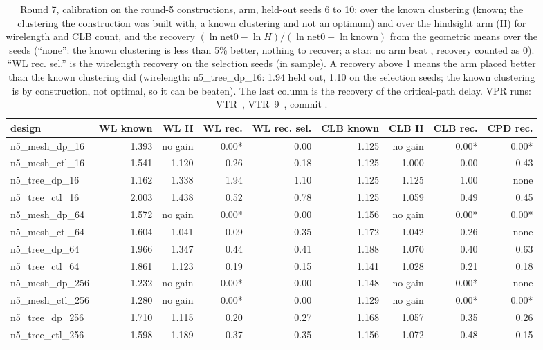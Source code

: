 \begin{table}[t]
\caption{Round 7, calibration on the round-5 constructions,  arm, held-out seeds 6 to 10:  over the known clustering (known; the clustering the construction was built with, a known clustering and not an optimum) and over the hindsight arm (H) for wirelength and CLB count, and the recovery $(\ln \mathrm{net0}-\ln H)/(\ln \mathrm{net0}-\ln \mathrm{known})$ from the geometric means over the seeds (``none'': the known clustering is less than 5\% better, nothing to recover; a star: no arm beat , recovery counted as 0). ``WL rec. sel.'' is the wirelength recovery on the selection seeds (in sample). A recovery above 1 means the arm placed better than the known clustering did (wirelength: n5\_tree\_dp\_16: 1.94 held out, 1.10 on the selection seeds; the known clustering is by construction, not optimal, so it can be beaten). The last column is the recovery of the critical-path delay. VPR runs: VTR~\cite{rose2012vtr}, VTR~9~\cite{elgammal2025vtr9}, commit .}
\label{tab:r7calib}
\centering\scriptsize\setlength{\tabcolsep}{3pt}
\begin{tabular}{@{}lrrrrrrrr@{}}
\toprule
design & WL known & WL H & WL rec. & WL rec. sel. & CLB known & CLB H & CLB rec. & CPD rec. \\
\midrule
n5\_mesh\_dp\_16 & 1.393 & no gain & 0.00* & 0.00 & 1.125 & no gain & 0.00* & 0.00* \\
n5\_mesh\_ctl\_16 & 1.541 & 1.120 & 0.26 & 0.18 & 1.125 & 1.000 & 0.00 & 0.43 \\
n5\_tree\_dp\_16 & 1.162 & 1.338 & 1.94 & 1.10 & 1.125 & 1.125 & 1.00 & none \\
n5\_tree\_ctl\_16 & 2.003 & 1.438 & 0.52 & 0.78 & 1.125 & 1.059 & 0.49 & 0.45 \\
n5\_mesh\_dp\_64 & 1.572 & no gain & 0.00* & 0.00 & 1.156 & no gain & 0.00* & 0.00* \\
n5\_mesh\_ctl\_64 & 1.604 & 1.041 & 0.09 & 0.35 & 1.172 & 1.042 & 0.26 & none \\
n5\_tree\_dp\_64 & 1.966 & 1.347 & 0.44 & 0.41 & 1.188 & 1.070 & 0.40 & 0.63 \\
n5\_tree\_ctl\_64 & 1.861 & 1.123 & 0.19 & 0.15 & 1.141 & 1.028 & 0.21 & 0.18 \\
n5\_mesh\_dp\_256 & 1.232 & no gain & 0.00* & 0.00 & 1.148 & no gain & 0.00* & none \\
n5\_mesh\_ctl\_256 & 1.280 & no gain & 0.00* & 0.00 & 1.129 & no gain & 0.00* & 0.00* \\
n5\_tree\_dp\_256 & 1.710 & 1.115 & 0.20 & 0.27 & 1.168 & 1.057 & 0.35 & 0.26 \\
n5\_tree\_ctl\_256 & 1.598 & 1.189 & 0.37 & 0.35 & 1.156 & 1.072 & 0.48 & -0.15 \\
\bottomrule
\end{tabular}
\end{table}

